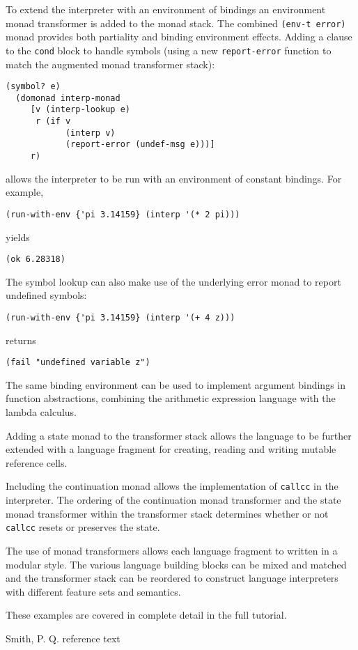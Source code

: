 \documentclass[natbib,10pt]{sigplanconf}
\begin{document}
To extend the interpreter with an environment of bindings an
environment monad transformer is added to the monad stack.  The
combined {\tt (env-t error)} monad provides both partiality and
binding environment effects.  Adding a clause to the {\tt cond} block
to handle symbols (using a new {\tt report-error} function to match the
augmented monad transformer stack):
\begin{verbatim}
(symbol? e)
  (domonad interp-monad
     [v (interp-lookup e)
      r (if v
            (interp v)
            (report-error (undef-msg e)))]
     r)
\end{verbatim}
allows the interpreter to be run with an environment of constant
bindings.  For example,
\begin{verbatim}
(run-with-env {'pi 3.14159} (interp '(* 2 pi)))
\end{verbatim}
yields
\begin{verbatim}
(ok 6.28318)
\end{verbatim}
The symbol lookup can also make use of the underlying error monad
to report undefined symbols:
\begin{verbatim}
(run-with-env {'pi 3.14159} (interp '(+ 4 z)))
\end{verbatim}
returns
\begin{verbatim}
(fail "undefined variable z")
\end{verbatim}

The same binding environment can be used to implement argument
bindings in function abstractions, combining the arithmetic expression
language with the lambda calculus.

Adding a state monad to the transformer stack allows the language to
be further extended with a language fragment for creating, reading
and writing mutable reference cells.

Including the continuation monad allows the implementation of
{\tt callcc} in the interpreter.  The ordering of the continuation
monad transformer and the state monad transformer within the
transformer stack determines whether or not {\tt callcc} resets
or preserves the state.

The use of monad transformers allows each language fragment to written
in a modular style.  The various language building blocks can be mixed
and matched and the transformer stack can be reordered to construct
language interpreters with different feature sets and semantics.

These examples are covered in complete detail in the full tutorial.







\begin{thebibliography}{}

Smith, P. Q. reference text

\end{thebibliography}
\end{document}
